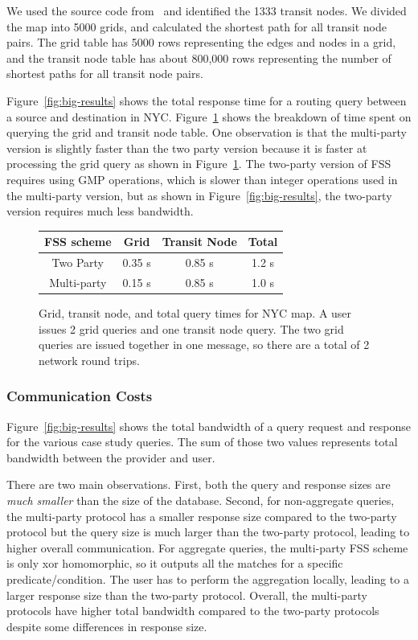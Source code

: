 We used the source code from~\cite{tnr} and identified the 1333 transit nodes. We divided the map into 5000 grids,
and calculated the shortest path for all transit node pairs. The grid table has 5000 rows
representing the edges and nodes in a grid, and the transit node table has about 800,000
rows representing the number of shortest paths for all transit node pairs. 

Figure~\ref{fig:big-results} shows the total response time for a routing query
between a source and destination in NYC. Figure~\ref{fig:map-results} shows
the breakdown of time spent on querying the grid and transit node table.
One observation is that the multi-party version is slightly faster than the two party
version because it is faster at processing the grid query as shown in Figure~\ref{fig:map-results}.
The two-party version of FSS requires using GMP operations, which is slower than integer operations
used in the multi-party version, but as shown in Figure~\ref{fig:big-results}, the two-party
version requires much less bandwidth.

\begin{figure}
	\centering
		\begin{tabular}{cccc}
			\toprule
			\bf FSS scheme & \bf Grid & \bf Transit Node & \bf Total \\
			\midrule
			Two Party & 0.35 s  & 0.85 s & 1.2 s \\
			Multi-party & 0.15 s & 0.85 s & 1.0 s \\
			\bottomrule
		\end{tabular}
	\caption[Grid, transit node, and total query times for NYC map.]{Grid, transit node, and total query times for NYC map. A user issues 2 grid queries and one transit node query. The two grid queries
		are issued together in one message, so there are a total of 2 network round trips.}
	\label{fig:map-results}
\end{figure}

\subsubsection{Communication Costs}
\label{sec:communication}
Figure~\ref{fig:big-results} shows the total bandwidth of a query request and response
for the various case study queries. The sum of those
two values represents total bandwidth between the provider and user.

There are two main observations. First, both the query and response sizes are \textit{much smaller} than the size
of the database. Second, for non-aggregate queries, the multi-party protocol has 
a smaller response size compared to the two-party protocol but the query size is much larger
than the two-party protocol, leading to higher overall communication. 
For aggregate queries, the multi-party FSS scheme is only xor homomorphic, so
it outputs all the matches for a specific predicate/condition. The user has to perform
the aggregation locally, leading to a larger response size than the two-party protocol.
Overall, the multi-party protocols have higher total bandwidth compared to the two-party protocols
despite some differences in response size.


